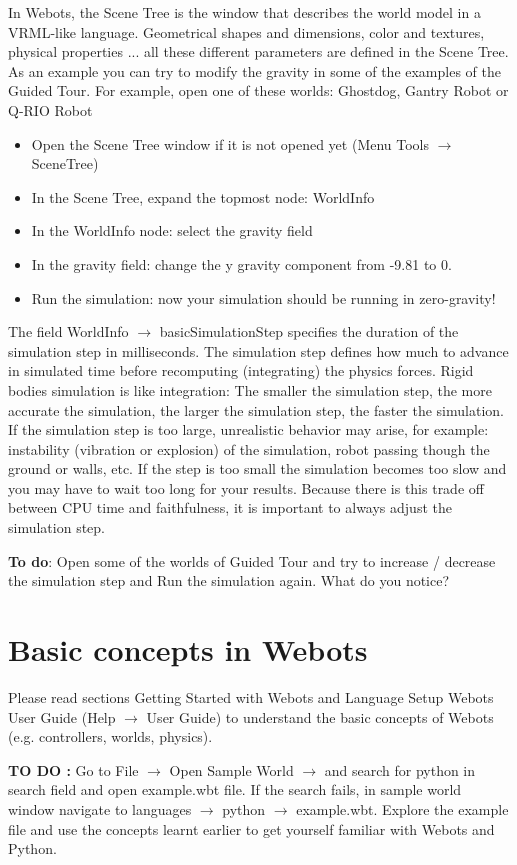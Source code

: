 \documentclass{cmc}
\begin{document}
In Webots, the Scene Tree is the window that describes the world model
in a VRML-like language. Geometrical shapes and dimensions, color and
textures, physical properties ... all these different parameters are
defined in the Scene Tree. As an example you can try to modify the
gravity in some of the examples of the Guided Tour.  For example, open
one of these worlds: Ghostdog, Gantry Robot or Q-RIO Robot
\begin{itemize}
\item Open the Scene Tree window if it is not opened yet (Menu Tools
  $\rightarrow$ SceneTree)
\item In the Scene Tree, expand the topmost node: WorldInfo
\item In the WorldInfo node: select the gravity field
\item In the gravity field: change the y gravity component from -9.81
  to 0.
\item Run the simulation: now your simulation should be running in
  zero-gravity!
\end{itemize}

The field WorldInfo $\rightarrow$ basicSimulationStep specifies the
duration of the simulation step in milliseconds. The simulation step
defines how much to advance in simulated time before recomputing
(integrating) the physics forces. Rigid bodies simulation is like
integration: The smaller the simulation step, the more accurate the
simulation, the larger the simulation step, the faster the
simulation. If the simulation step is too large, unrealistic behavior
may arise, for example: instability (vibration or explosion) of the
simulation, robot passing though the ground or walls, etc. If the step
is too small the simulation becomes too slow and you may have to wait
too long for your results. Because there is this trade off between CPU
time and faithfulness, it is important to always adjust the simulation
step.

\textbf{To do}: Open some of the worlds of Guided Tour and try to
increase / decrease the simulation step and Run the simulation
again. What do you notice?

\section{Basic concepts in Webots}
\label{sec:basic-conc-webots}

Please read sections Getting Started with Webots and Language Setup
Webots User Guide (Help $\rightarrow$ User Guide) to understand the
basic concepts of Webots (e.g. controllers, worlds, physics).

\textbf{TO DO : } Go to File $\rightarrow$ Open Sample World
$\rightarrow$ and search for python in search field and open
example.wbt file. If the search fails, in sample world window navigate
to languages $\rightarrow$ python $\rightarrow$ example.wbt.
Explore the example file and use the concepts learnt earlier to get
yourself familiar with Webots and Python.
\end{document}
